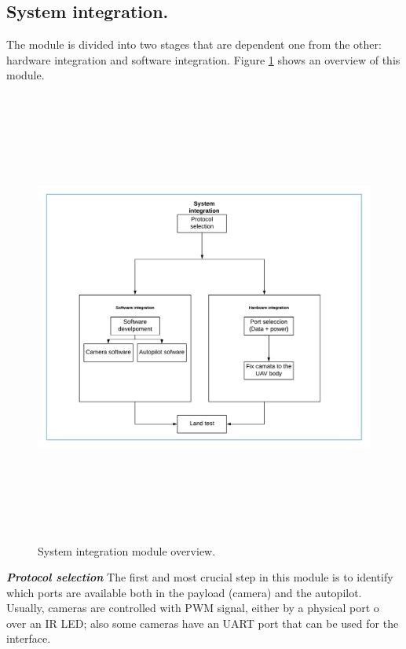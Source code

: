 \subsection{System integration.}
The module is divided into two stages that are dependent one from the other: hardware integration and software integration. Figure \ref{fig:Systemintegration} shows an overview of this module.
\begin{figure}[H]
\centering
\includegraphics[width=15cm,height=15cm,keepaspectratio]{imagenes/Systemintegration.png}
\caption{System integration module overview.}
\label{fig:Systemintegration}
\end{figure}
\textit{\textbf{Protocol selection}}\newline
The first and most crucial step in this module is to identify which ports are available both in the payload (camera) and the autopilot. Usually,  cameras are controlled with PWM signal, either by a physical port o over an IR LED; also some cameras have an UART port that can be used for the interface. 

